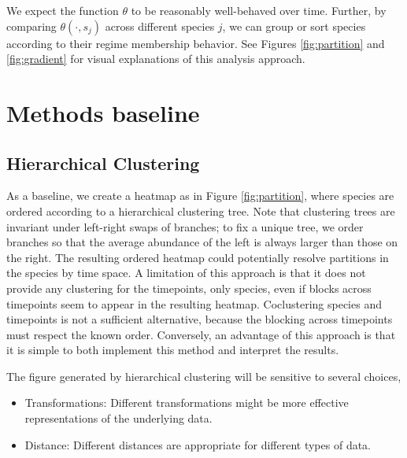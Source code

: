 \documentclass{article}
\begin{document}
We expect the function $\theta$ to be reasonably well-behaved over time.
Further, by comparing $\theta\left(\cdot, s_{j}\right)$ across different species
$j$, we can group or sort species according to their regime membership behavior.
See Figures \ref{fig:partition} and \ref{fig:gradient} for visual explanations
of this analysis approach.

\section{Methods baseline}
\label{sec:baseline}

\subsection{Hierarchical Clustering}

As a baseline, we create a heatmap as in Figure \ref{fig:partition}, where
species are ordered according to a hierarchical clustering tree. Note that
clustering trees are invariant under left-right swaps of branches; to fix a
unique tree, we order branches so that the average abundance of the left is
always larger than those on the right. The resulting ordered heatmap could
potentially resolve partitions in the species by time space. A limitation of
this approach is that it does not provide any clustering for the timepoints,
only species, even if blocks across timepoints seem to appear in the resulting
heatmap. Coclustering species and timepoints is not a sufficient alternative,
because the blocking across timepoints must respect the known order. Conversely,
an advantage of this approach is that it is simple to both implement this method
and interpret the results.

The figure generated by hierarchical clustering will be sensitive to several
choices,
\begin{itemize}
\item Transformations: Different transformations might be more effective
  representations of the underlying data.
\item Distance: Different distances are appropriate for different types of data.
\end{itemize}
\end{document}
